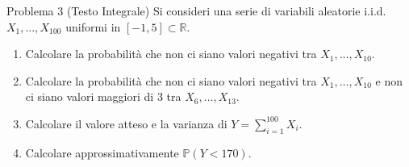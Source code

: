 \documentclass[11pt,a4paper]{article}
\newcommand{\Prob}{\mathbb{P}}
\begin{document}
\begin{problemabox}{Problema 3 (Testo Integrale)}
Si consideri una serie di variabili aleatorie i.i.d. $X_1,\dots,X_{100}$ uniformi in $[-1,5] \subset \mathbb{R}$.
\begin{enumerate}[label=(\alph*)]
    \item Calcolare la probabilità che non ci siano valori negativi tra $X_1,\dots,X_{10}$.
    \item Calcolare la probabilità che non ci siano valori negativi tra $X_1,\dots,X_{10}$ e non ci siano valori maggiori di $3$ tra $X_6,\dots,X_{13}$.
    \item Calcolare il valore atteso e la varianza di $Y = \sum_{i=1}^{100} X_i$.
    \item Calcolare approssimativamente $\Prob(Y < 170)$.
\end{enumerate}
\end{problemabox}
\end{document}
